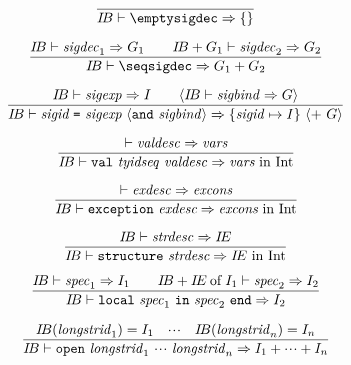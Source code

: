 \begin{equation}	%
\frac{}
     { \IB\ts\emptysigdec\ra\emptymap }
\end{equation}

\begin{equation}	%
\frac{ \IB\ts\sigdec_1\ra\G_1 \qquad \plusmap{\IB}{\G_1}\ts\sigdec_2\ra\G_2 }
     { \IB\ts\seqsigdec\ra\plusmap{\G_1}{\G_2} }
\end{equation}


\begin{equation}	%
\frac{ \IB\ts\sigexp\ra\I
        \qquad\langle\IB\ts\sigbind\ra\G\rangle }
     { \IB\ts\sigbinder\ra\{\sigid\mapsto\I\}
       \ \langle +\ \G\rangle }\index{61.4}
\end{equation}
%
%

\begin{equation}        %
\frac{ \ts\valdesc\ra\vars }
     { \IB\ts\valspec\ra\vars\ \In\ \Int }\index{61.5}
\end{equation}

\begin{equation}        %
\frac{ \ts\exndesc\ra\exns}
     { \IB\ts\exceptionspec\ra\exns\ \In\ \Int }
\end{equation}

\begin{equation}        %
\label{structurespec-dyn-rule}
\frac{ \IB\ts\strdesc\ra\IE }
     { \IB\ts\structurespec\ra\IE\ \In\ \Int }\index{62.1}
\end{equation}

\begin{equation}        %
\label{localspec-dyn-rule}
\frac{ \IB\ts\spec_1\ra\I_1 \qquad
       \plusmap{\IB}{\of{\IE}{\I_1}}\ts\spec_2\ra\I_2 }
     { \IB\ts\localspec\ra\I_2 }
\end{equation}

\begin{equation}        %
\frac{ \IB(\longstrid_1)=\I_1\quad\cdots\quad
       \IB(\longstrid_n)=\I_n }
     { \IB\ts\openspec\ra\I_1 + \cdots +\I_n }
\end{equation}

